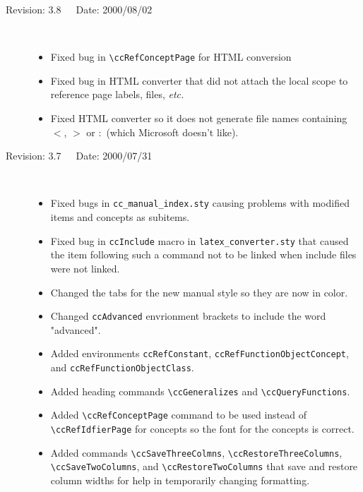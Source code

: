 \documentclass[11pt]{article}
\begin{document}
\begin{description}
    \item[Revision: 3.8~~~Date: 2000/08/02]~\\[-3mm]
    \begin{itemize}
        \item Fixed bug in \verb|\ccRefConceptPage| for HTML conversion
        \item Fixed bug in HTML converter that did not attach the local scope
              to reference page labels, files, {\em etc.}
        \item Fixed HTML converter so it does not generate file names
              containing $<$, $>$ or $:$ (which Microsoft doesn't like).
    \end{itemize}
    \item[Revision: 3.7~~~Date: 2000/07/31]~\\[-3mm]
    \begin{itemize}
        \item Fixed bugs in {\tt cc\_manual\_index.sty} causing problems with
              modified items and concepts as subitems.
        \item Fixed bug in {\tt ccInclude} macro in {\tt latex\_converter.sty}
              that caused the item following such a command not to be linked
              when include files were not linked.
        \item Changed the tabs for the new manual style so they are now in
              color.
        \item Changed {\tt ccAdvanced} envrionment brackets to include the
              word "advanced".
        \item Added environments {\tt ccRefConstant},
              {\tt ccRefFunctionObjectConcept}, and
              {\tt ccRefFunctionObjectClass}.
        \item Added heading commands \verb|\ccGeneralizes| and
              \verb|\ccQueryFunctions|.
        \item Added \verb|\ccRefConceptPage| command to be used instead of
              \verb|\ccRefIdfierPage| for concepts so the font for the concepts
              is correct.
        \item Added commands \verb|\ccSaveThreeColmns|,
              \verb|\ccRestoreThreeColumns|, \verb|\ccSaveTwoColumns|,
              and \verb|\ccRestoreTwoColumns| that save and restore column
              widths for help in temporarily changing formatting.
    \end{itemize}

\end{description}
\end{document}
